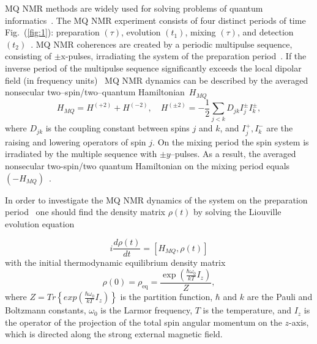 \documentclass[preprint,12pt]{elsarticle}
\begin{document}
MQ NMR methods are widely used for solving problems of quantum informatics~\cite{17,18}. The MQ NMR experiment consists of four distinct periods of time Fig.~(\ref{fig:1}): preparation $(\tau)$, evolution $(t_1)$, mixing $(\tau)$, and detection $(t_2)$~\cite{10}.
MQ NMR coherences are created by a periodic multipulse sequence, consisting of
$\pm$x-pulses, irradiating the system of the preparation period~\cite{10}.
If the inverse period of the multipulse sequence significantly exceeds the local dipolar field (in frequency units)~\cite{19}
MQ NMR dynamics can be described by the averaged nonsecular two--spin/two--quantum Hamiltonian~$H_{MQ}$~\cite{20}
%
\begin{equation} \label{eq:1}
        H_{MQ} = H^{(+2)} + H^{(-2)} , \quad
        H^{(\pm 2)} = -\frac{1}{2} \sum_{j<k} D_{jk} I_{j} ^\pm I_k^\pm,
\end{equation}
%
where $D_{jk}$ is the coupling constant between spins $j$ and $k$,
and $I_{j}^+, I_k ^-$ are the raising and lowering operators of spin $j$.
On the mixing period the spin system is irradiated by the multiple sequence with $\pm y$--pulses.
As a result, the averaged nonsecular two-spin/two quantum Hamiltonian on the mixing period equals $(-H_{MQ})$~\cite{10}.


In order to investigate the MQ NMR dynamics of the system on the preparation period~\cite{10} one should find the density matrix $\rho(t)$ by solving the Liouville evolution equation~\cite{19}

\begin{equation}
    \label{eq:2}
        i\frac{d\rho(t)}{dt} = [H_{MQ}, \rho(t)]
\end{equation}
with the initial thermodynamic equilibrium density matrix
\begin{equation}
    \label{eq:3}
        \rho(0) = \rho_\mathrm{eq} = \frac{\exp(\frac{\hbar \omega_0}{kT}I_z)}{Z},
\end{equation}
where $Z=Tr \left\{exp\left(\frac{\hbar \omega_0}{kT}I_z\right) \right\}$ is the partition function, $\hbar$ and $k$ are the Pauli and Boltzmann constants, $\omega_0$ is the Larmor frequency, $T$ is the temperature, and $I_z$ is the operator of the projection of the total spin angular momentum on the $z$-axis, which is directed along the strong external magnetic field.
\end{document}
